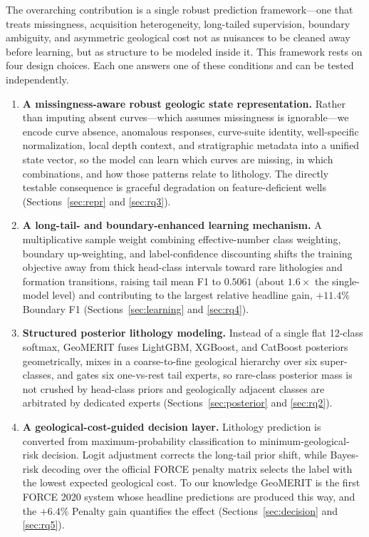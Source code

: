 \documentclass[bdcc,article,submit,pdftex,moreauthors]{Definitions/mdpi}
\begin{document}
The overarching contribution is a single robust prediction framework---one that treats
missingness, acquisition heterogeneity, long-tailed supervision, boundary ambiguity, and
asymmetric geological cost not as nuisances to be cleaned away before learning, but as
structure to be modeled inside it. This framework rests on four design choices. Each one answers one of these conditions and can
be tested independently.
\begin{enumerate}
\item \textbf{A missingness-aware robust geologic state representation.} Rather than imputing
absent curves---which assumes missingness is ignorable---we encode curve absence, anomalous
responses, curve-suite identity, well-specific normalization, local depth context, and
stratigraphic metadata into a unified state vector, so the model can learn which curves are
missing, in which combinations, and how those patterns relate to lithology. The directly
testable consequence is graceful degradation on feature-deficient wells
(Sections~\ref{sec:repr} and \ref{sec:rq3}).
\item \textbf{A long-tail- and boundary-enhanced learning mechanism.} A multiplicative sample
weight combining effective-number class weighting, boundary up-weighting, and label-confidence
discounting shifts the training objective away from thick head-class intervals toward rare
lithologies and formation transitions, raising tail mean F1 to $0.5061$ (about $1.6\times$ the
single-model level) and contributing to the largest relative headline gain, $+11.4\%$
Boundary F1 (Sections~\ref{sec:learning} and \ref{sec:rq4}).
\item \textbf{Structured posterior lithology modeling.} Instead of a single flat 12-class
softmax, GeoMERIT fuses LightGBM, XGBoost, and CatBoost posteriors geometrically, mixes in a
coarse-to-fine geological hierarchy over six super-classes, and gates six one-vs-rest tail
experts, so rare-class posterior mass is not crushed by head-class priors and geologically
adjacent classes are arbitrated by dedicated experts (Sections~\ref{sec:posterior} and
\ref{sec:rq2}).
\item \textbf{A geological-cost-guided decision layer.} Lithology prediction is converted from
maximum-probability classification to minimum-geological-risk decision. Logit adjustment
corrects the long-tail prior shift, while Bayes-risk decoding over the official FORCE penalty
matrix selects the label with the lowest expected geological cost. To our knowledge GeoMERIT
is the first FORCE 2020 system whose headline predictions are produced this way, and the
$+6.4\%$ Penalty gain quantifies the effect (Sections~\ref{sec:decision} and \ref{sec:rq5}).
\end{enumerate}
\end{document}
